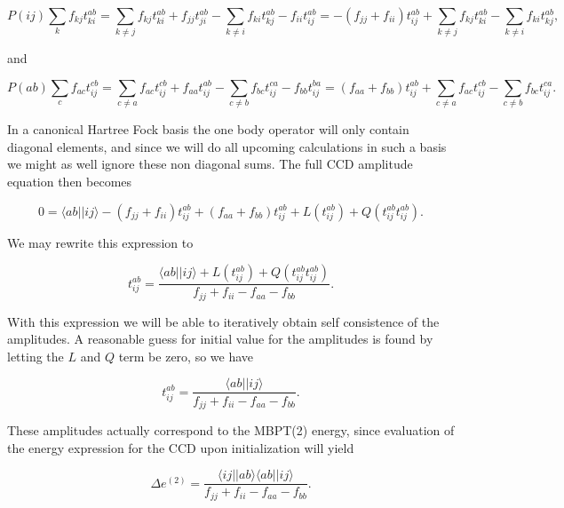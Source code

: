 \begin{equation}
P(ij) \sum_{k} f_{kj} t_{ki}^{ab} = \sum_{k \neq j} f_{kj} t_{ki}^{ab} + f_{jj} t_{ji}^{ab} - \sum_{k \neq i} f_{ki} t_{kj}^{ab}   - f_{ii} t_{ij}^{ab} =  -(f_{jj} + f_{ii}) t_{ij}^{ab} + \sum_{k \neq j} f_{kj} t_{ki}^{ab}  - \sum_{k \neq i} f_{ki} t_{kj}^{ab}  ,
\end{equation}

and

\begin{equation}
P(ab) \sum_{c} f_{ac} t_{ij}^{cb} = \sum_{c \neq a} f_{ac} t_{ij}^{cb} + f_{aa} t_{ij}^{ab} - \sum_{c \neq b} f_{bc} t_{ij}^{ca} -   f_{bb} t_{ij}^{ba} = (f_{aa} + f_{bb}) t_{ij}^{ab} +  \sum_{c \neq a} f_{ac} t_{ij}^{cb} - \sum_{c \neq b} f_{bc} t_{ij}^{ca}.
\end{equation}

In a canonical Hartree Fock basis the one body operator will only contain diagonal elements, and since we will do all upcoming calculations in such a basis we might as well ignore these non diagonal sums. The full CCD amplitude equation then becomes

\begin{equation}
0 =\langle ab \vert \vert ij \rangle -(f_{jj} + f_{ii}) t_{ij}^{ab}+(f_{aa} + f_{bb}) t_{ij}^{ab}+L(t^{ab}_{ij}) + Q(t^{ab}_{ij}t^{ab}_{ij}).
\end{equation}

We may rewrite this expression to

\begin{equation}
 t_{ij}^{ab} =\frac{\langle ab \vert \vert ij \rangle+L(t^{ab}_{ij}) + Q(t^{ab}_{ij}t^{ab}_{ij})}{f_{jj} + f_{ii} - f_{aa} - f_{bb} }.
\end{equation}

With this expression we will be able to iteratively obtain self consistence of the amplitudes. A reasonable guess for initial value for the amplitudes is found by letting the $L$ and $Q$ term be zero, so we have

\begin{equation}
 t_{ij}^{ab} =\frac{\langle ab \vert \vert ij \rangle}{f_{jj} + f_{ii} - f_{aa} - f_{bb} }.
\label{eqn:initialguess}
\end{equation}

These amplitudes actually correspond to the MBPT(2) energy, since evaluation of the energy expression for the CCD upon initialization will yield

\begin{equation}
\Delta e^(2) =\frac{\langle ij \vert \vert ab \rangle \langle ab \vert \vert ij \rangle}{f_{jj} + f_{ii} - f_{aa} - f_{bb} }.
\label{eqn:initialenergy}
\end{equation}


